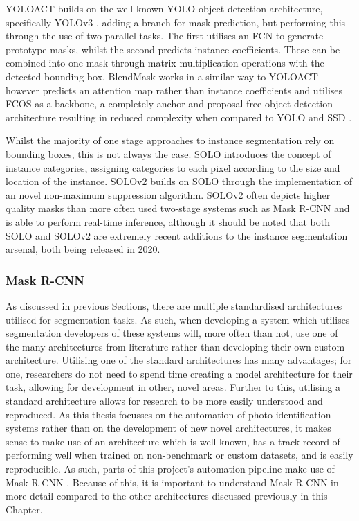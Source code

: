 YOLOACT \cite{bolya_190402689_2019} builds on the well known YOLO object detection architecture, specifically YOLOv3 \cite{redmon_yolov3_2018}, adding a branch for mask prediction, but performing this through the use of two parallel tasks. The first utilises an FCN to generate prototype masks, whilst the second predicts instance coefficients. These can be combined into one mask through matrix multiplication operations with the detected bounding box. BlendMask \cite{chen_blendmask_2020} works in a similar way to YOLOACT however predicts an attention map rather than instance coefficients and utilises FCOS \cite{tian_fcos_2019} as a backbone, a completely anchor and proposal free object detection architecture resulting in reduced complexity when compared to YOLO \cite{redmon_you_2016} and SSD \cite{liu_ssd:_2016}. 

Whilst the majority of one stage approaches to instance segmentation rely on bounding boxes, this is not always the case. SOLO \cite{wang_solo_2020} introduces the concept of instance categories, assigning categories to each pixel according to the size and location of the instance. SOLOv2 \cite{wang_solov2_2020} builds on SOLO through the implementation of an novel non-maximum suppression algorithm. SOLOv2 often depicts higher quality masks than more often used two-stage systems such as Mask R-CNN and is able to perform real-time inference, although it should be noted that both SOLO and SOLOv2 are extremely recent additions to the instance segmentation arsenal, both being released in 2020. 

\subsubsection{Mask R-CNN}\label{ch:Background,sec:instanceSegmentation,sub:Mask R-CNN}

As discussed in previous Sections, there are multiple standardised architectures utilised for segmentation tasks. As such, when developing a system which utilises segmentation developers of these systems will, more often than not, use one of the many architectures from literature rather than developing their own custom architecture. Utilising one of the standard architectures has many advantages; for one, researchers do not need to spend time creating a model architecture for their task, allowing for development in other, novel areas. Further to this, utilising a standard architecture allows for research to be more easily understood and reproduced. As this thesis focusses on the automation of photo-identification systems rather than on the development of new novel architectures, it makes sense to make use of an architecture which is well known, has a track record of performing well when trained on non-benchmark or custom datasets, and is easily reproducible. As such, parts of this project's automation pipeline make use of Mask R-CNN \cite{he_mask_2017}. Because of this, it is important to understand Mask R-CNN in more detail compared to the other architectures discussed previously in this Chapter. 

